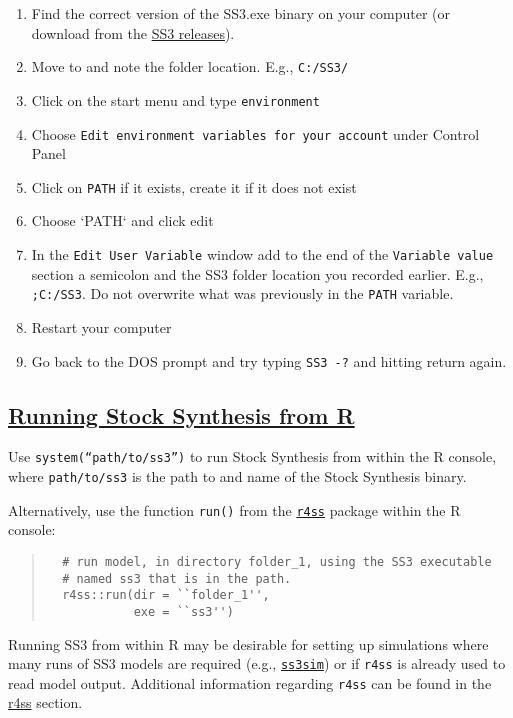 \begin{enumerate}
  \item Find the correct version of the SS3.exe binary on your computer (or download from the \href{https://github.com/nmfs-ost/ss3-source-code/releases}{SS3 releases}).
  \item Move to and note the folder location. E.g., \texttt{C:/SS3/}
  \item Click on the start menu and type \texttt{environment}
  \item Choose \texttt{Edit environment variables for your account} under Control Panel
  \item Click on \texttt{PATH} if it exists, create it if it does not exist 
  \item Choose `PATH` and click edit
  \item In the \texttt{Edit User Variable} window add to the end of the \texttt{Variable value} section a semicolon and the SS3 folder location you recorded earlier.
     E.g., \texttt{;C:/SS3}. Do not overwrite what was previously in the \texttt{PATH} variable.
  \item Restart your computer
  \item Go back to the DOS prompt and try typing \texttt{SS3 -?} and hitting return again.
\end{enumerate}

\hypertarget{SS3inR}{}
\subsection[Running Stock Synthesis from R]{\protect\hyperlink{SS3inR}{Running Stock Synthesis from R}}
Use \texttt{system(``path/to/ss3'')} to run Stock Synthesis from within the R console, where \texttt{path/to/ss3} is the path to and name of the Stock Synthesis binary.

Alternatively, use the function \texttt{run()} from the \href{https://r4ss.github.io/r4ss/index.html}{\texttt{r4ss}} package within the R console:

\begin{quote}
  \begin{verbatim}
  # run model, in directory folder_1, using the SS3 executable
  # named ss3 that is in the path.
  r4ss::run(dir = ``folder_1'',
            exe = ``ss3'')
  \end{verbatim}
\end{quote}

Running SS3 from within R may be desirable for setting up simulations where many runs of SS3 models are required (e.g., \href{https://github.com/ss3sim/ss3sim}{\texttt{ss3sim}}) or if \texttt{r4ss} is already used to read model output. Additional information regarding \texttt{r4ss} can be found in the \hyperref[sec:r4ss]{r4ss} section. 


